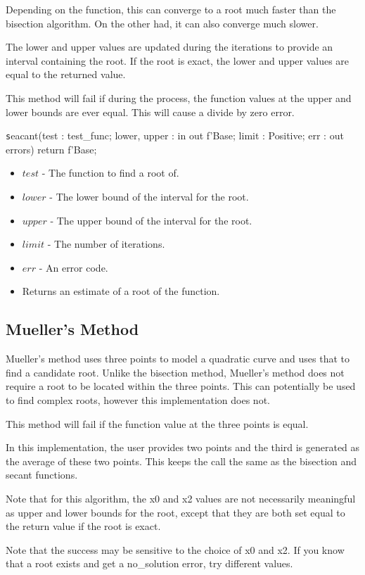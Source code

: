 \documentclass[10pt, openany]{book}
\newcommand{\function}[1]{\texttt{#1}}
\begin{document}
Depending on the function, this can converge to a root much faster than the bisection algorithm.  On the other had, it can also converge much slower.

The lower and upper values are updated during the iterations to provide an interval containing the root.  If the root is exact, the lower and upper values are equal to the returned value.

This method will fail if during the process, the function values at the upper and lower bounds are ever equal.  This will cause a divide by zero error.

\function seacant(test : test\_func; lower, upper : in out f'Base; limit : Positive; err : out errors) return f'Base;
\begin{itemize}
  \item $test$ - The function to find a root of.
  \item $lower$ - The lower bound of the interval for the root.
  \item $upper$ - The upper bound of the interval for the root.
  \item $limit$ - The number of iterations.
  \item $err$ - An error code.
  \item Returns an estimate of a root of the function.
\end{itemize}

\subsection{Mueller's Method}
Mueller's method uses three points to model a quadratic curve and uses that to find a candidate root.    Unlike the bisection method, Mueller's method does not require a root to be located within the three points.  This can potentially be used to find complex roots, however this implementation does not.

This method will fail if the function value at the three points is equal.

In this implementation, the user provides two points and the third is generated as the average of these two points.  This keeps the call the same as the bisection and secant functions.

Note that for this algorithm, the x0 and x2 values are not necessarily meaningful as upper and lower bounds for the root, except that they are both set equal to the return value if the root is exact.

Note that the success may be sensitive to the choice of x0 and x2.  If you know that a root exists and get a no\_solution error, try different values.
\end{document}
